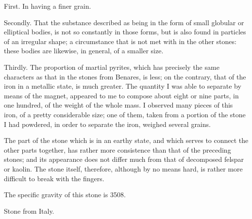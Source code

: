 \documentclass[a4paper, 12pt, oneside]{article}
\begin{document}
First. In having a finer grain.

Secondly. That the substance described as being in the form of small globular or elliptical bodies, is not so constantly in those forms, but is also found in particles of an irregular shape; a circumstance that is not met with in the other stones: these bodies are likewise, in general, of a smaller size.

Thirdly. The proportion of martial pyrites, which has precisely the same characters as that in the stones from Benares, is less; on the contrary, that of the iron in a metallic state, is much greater. The quantity I was able to separate by means of the magnet, appeared to me to compose about eight or nine parts, in one hundred, of the weight of the whole mass. I observed many pieces of this iron, of a pretty considerable size; one of them, taken from a portion of the stone I had powdered, in order to separate the iron, weighed several grains.

The part of the stone which is in an earthy state, and which serves to connect the other parts together, has rather more consistence than that of the preceding stones; and its appearance does not differ much from that of decomposed felspar or kaolin. The stone itself, therefore, although by no means hard, is rather more difficult to break with the fingers.

The specific gravity of this stone is 3508.
\begin{center}
Stone from Italy.
\end{center}
\end{document}
